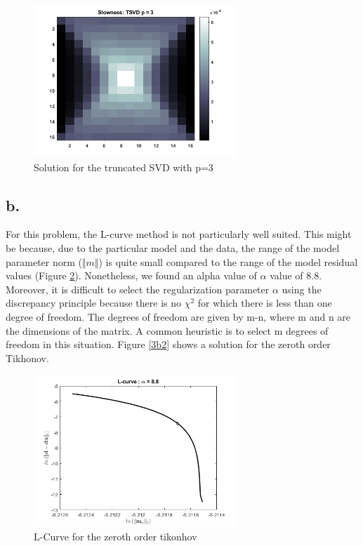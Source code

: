 \documentclass{article}
\begin{document}
\begin{figure}[ht!]
    \centering
    \includegraphics[width=3in]{3a2.png}
    \caption{Solution for the truncated SVD with p=3}
    \label{3a2}
\end{figure}

\FloatBarrier

\subsection*{b.} 
For this problem, the L-curve method is not particularly well suited. This might be because, due to the particular model and the data, the range of the model parameter norm ($\Vert m \Vert$) is quite small compared to the range of the model residual values (Figure \ref{3b1}). Nonetheless, we found an alpha value of $\alpha$ value of 8.8. 
Moreover, it is difficult to select the regularization parameter $\alpha$ using the discrepancy principle because there is no $\chi^2$ for which there is less than one degree of freedom. The degrees of freedom are given by m-n, where m and n are the dimensions of the matrix. A common heuristic is to select m degrees of freedom in this situation. Figure \ref{3b2} shows a solution for the zeroth order Tikhonov. 

\begin{figure}[!h]
    \centering
    \includegraphics[width=3in]{3b1.png}
    \caption{L-Curve for the zeroth order tikonhov}
    \label{3b1}
\end{figure}
\end{document}
